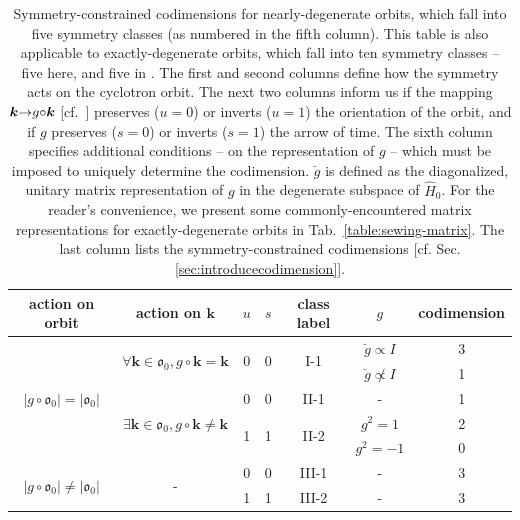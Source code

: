 \documentclass[aps, showpacs, twocolumn, notitlepage, superscriptaddress]{revtex4-1}
\begin{document}
\begin{table}
\begin{tabular}{|c|c|c|c|c|c|c|}
\hline 
action on orbit & action on $\boldsymbol{k}$  & $u$ & $s$  & class label & $g$  & codimension\tabularnewline
\hline 
\multirow{5}{*}{$|g\circ\mathfrak{o}_{0}|=|\mathfrak{o}_{0}|$} & \multirow{2}{*}{$\forall\boldsymbol{k}\in\mathfrak{o}_{0},g\circ\boldsymbol{k}=\boldsymbol{k}$} & \multirow{2}{*}{0} & \multirow{2}{*}{0} & \multirow{2}{*}{I-1} & $\breve{g}\propto I$  & 3\tabularnewline
\cline{6-7} 
 &  &  &  &  & $\breve{g}\not\propto I$  & 1\tabularnewline
\cline{2-7} 
 & \multirow{3}{*}{$\exists\boldsymbol{k}\in\mathfrak{o}_{0},g\circ\boldsymbol{k}\neq\boldsymbol{k}$} & 0 & 0 & II-1 & - & 1\tabularnewline
\cline{3-7} 
 &  & \multirow{2}{*}{1} & \multirow{2}{*}{1} & \multirow{2}{*}{II-2} & $g^{2}=1$  & 2\tabularnewline
\cline{6-7} 
 &  &  &  &  & $g^{2}=-1$  & 0\tabularnewline
\hline 
\multirow{2}{*}{$|g\circ\mathfrak{o}_{0}|\neq|\mathfrak{o}_{0}|$ } & \multirow{2}{*}{-} & 0 & 0 & III-1 & - & 3\tabularnewline
\cline{3-7} 
 &  & 1 & 1 & III-2 & - & 3\tabularnewline
\hline 
\end{tabular}
\caption{Symmetry-constrained codimensions for nearly-degenerate orbits, which fall into five symmetry classes (as numbered in the fifth column). This table is also applicable to exactly-degenerate orbits, which fall into ten symmetry classes -- five here, and five in  . The first and second columns define how the symmetry acts on the cyclotron orbit. The next two columns inform us if the mapping $\boldsymbol{k}{\rightarrow}g{\circ}\boldsymbol{k}$ [cf.\ ]  preserves ($u{=}0$) or inverts ($u{=}1$) the orientation of the orbit, and if $g$ preserves ($s{=}0$) or inverts ($s{=}1$) the arrow of time. The sixth column specifies additional conditions -- on the representation of $g$ -- which must be imposed to uniquely determine the codimension. $\breve{g}$ is defined as the diagonalized, unitary matrix representation of $g$ in the degenerate subspace of $\hat{H}_0$. For the reader's convenience, we present some commonly-encountered matrix representations for exactly-degenerate orbits in Tab.\ \ref{table:sewing-matrix}. The last column lists the symmetry-constrained codimensions [cf. Sec. \ref{sec:introducecodimension}]. \label{table:codimension-nearlydegen}}
\end{table}
\end{document}
